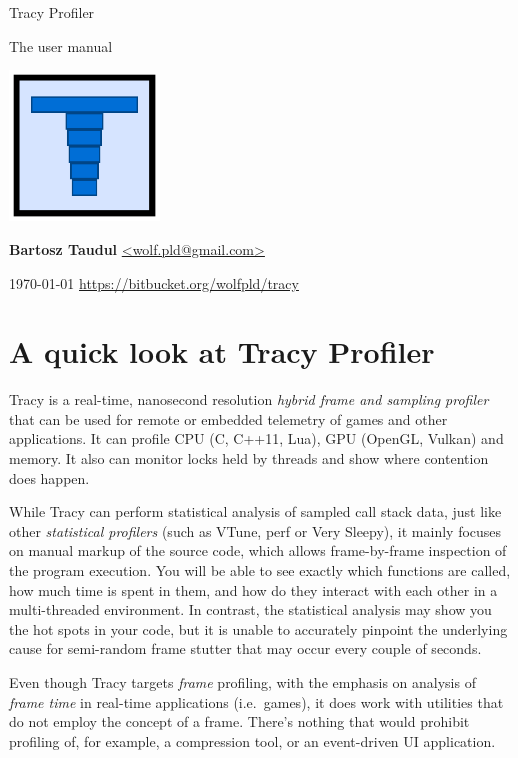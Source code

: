 \documentclass[hidelinks,titlepage,a4paper]{article}
\begin{document}
\begin{titlepage}
\centering
{\fontsize{120}{140}\selectfont Tracy Profiler}

\vspace{50pt} {\Huge{}\selectfont The user manual}

\vfill \includegraphics[height=40mm]{../icon/icon}

\vfill
\large\textbf{Bartosz Taudul} \href{mailto:wolf.pld@gmail.com}{<wolf.pld@gmail.com>}

\vspace{10pt}
\today
\vfill
\url{https://bitbucket.org/wolfpld/tracy}
\end{titlepage}

\tableofcontents

\newpage

\section{A quick look at Tracy Profiler}

Tracy is a real-time, nanosecond resolution \emph{hybrid frame and sampling profiler} that can be used for remote or embedded telemetry of games and other applications. It can profile CPU (C, C++11, Lua), GPU (OpenGL, Vulkan) and memory. It also can monitor locks held by threads and show where contention does happen.

While Tracy can perform statistical analysis of sampled call stack data, just like other \emph{statistical profilers} (such as VTune, perf or Very Sleepy), it mainly focuses on manual markup of the source code, which allows frame-by-frame inspection of the program execution. You will be able to see exactly which functions are called, how much time is spent in them, and how do they interact with each other in a multi-threaded environment. In contrast, the statistical analysis may show you the hot spots in your code, but it is unable to accurately pinpoint the underlying cause for semi-random frame stutter that may occur every couple of seconds.

Even though Tracy targets \emph{frame} profiling, with the emphasis on analysis of \emph{frame time} in real-time applications (i.e.~games), it does work with utilities that do not employ the concept of a frame. There's nothing that would prohibit profiling of, for example, a compression tool, or an event-driven UI application.
\end{document}
